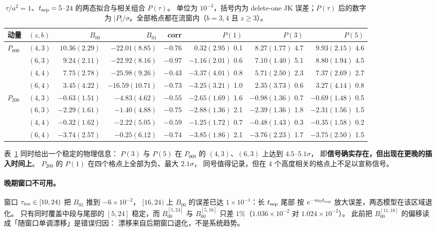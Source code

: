 \documentclass[UTF8,a4paper,11pt]{ctexart}
\begin{document}
\begin{table}[htbp]
\centering
\caption{$\tau/a^2=1$、$t_{\rm sep}=5$--$24$ 的两态拟合与相关组合 $P(\tau)$。
单位为 $10^{-3}$，括号内为 delete-one JK 误差；$P(\tau)$ 后的数字为
$|P|/\sigma$。全部格点都在流窗内（$b=3,4$ 且 $z\ge3$）。}
\label{tab:tau1combo}
\footnotesize
\setlength{\tabcolsep}{3pt}
\begin{tabular}{@{}llrrrrrr@{}}
\toprule
动量 & $(z,b)$ & $B_{00}$ & $B_{01}$ & corr & $P(1)$ & $P(3)$ & $P(5)$ \\
\midrule
\multirow{4}{*}{$P_{000}$}
 & $(4,3)$ & $10.36(2.29)$ & $-22.01(8.85)$ & $-0.76$ & $0.32(2.95)$ 0.1 & $8.27(1.77)$ 4.7 & $9.93(2.15)$ 4.6 \\
 & $(6,3)$ & $9.24(2.11)$  & $-22.92(8.16)$ & $-0.97$ & $-1.16(2.01)$ 0.6 & $7.10(1.40)$ 5.1 & $8.80(1.94)$ 4.5 \\
 & $(4,4)$ & $7.75(2.78)$  & $-25.98(9.26)$ & $-0.43$ & $-3.37(4.01)$ 0.8 & $5.71(2.50)$ 2.3 & $7.37(2.69)$ 2.7 \\
 & $(6,4)$ & $3.45(4.22)$  & $-16.59(10.71)$ & $-0.73$ & $-3.25(3.21)$ 1.0 & $2.35(3.73)$ 0.6 & $3.27(4.14)$ 0.8 \\
\midrule
\multirow{4}{*}{$P_{200}$}
 & $(4,3)$ & $-0.63(1.51)$ & $-4.83(4.62)$ & $-0.55$ & $-2.65(1.69)$ 1.6 & $-0.98(1.36)$ 0.7 & $-0.69(1.48)$ 0.5 \\
 & $(6,3)$ & $-2.29(1.61)$ & $-1.40(4.88)$ & $-0.75$ & $-2.88(1.36)$ 2.1 & $-2.39(1.36)$ 1.8 & $-2.31(1.56)$ 1.5 \\
 & $(4,4)$ & $-0.32(1.62)$ & $-2.22(5.05)$ & $-0.59$ & $-1.25(1.72)$ 0.7 & $-0.48(1.43)$ 0.3 & $-0.35(1.58)$ 0.2 \\
 & $(6,4)$ & $-3.74(2.57)$ & $-0.25(6.12)$ & $-0.74$ & $-3.85(1.86)$ 2.1 & $-3.76(2.23)$ 1.7 & $-3.75(2.50)$ 1.5 \\
\bottomrule
\end{tabular}
\end{table}

表~\ref{tab:tau1combo} 同时给出一个稳定的物理信息：
$P(3)$ 与 $P(5)$ 在 $P_{000}$ 的 $(4,3)$、$(6,3)$ 上达到 $4.5$--$5.1\sigma$，
即\textbf{信号确实存在，但出现在更晚的插入时间上}。
$P_{200}$ 的 $P(1)$ 在四个格点上全部为负、最大 $2.1\sigma$，
同号值得记录，但在 4 个高度相关的格点上不足以宣称信号。

\paragraph{晚期窗口不可用。}
窗口 $\tau_{\rm ins}\in[10,24)$ 把 $B_{01}$ 推到 $-6\times10^{-2}$，
$[16,24)$ 上 $B_{00}$ 的误差已达 $1\times10^{-1}$：长 $t_{\rm sep}$ 尾部
按 $e^{-m_0t_{\rm sep}}$ 放大误差，两态模型在该区域退化。
只有同时覆盖中段与尾部的 $[5,24]$ 稳定，而 $B_{00}^{[5,24]}$ 与
$B_{00}^{[5,16]}$ 只差 $1\%$（$1.036\times10^{-2}$ 对 $1.024\times10^{-2}$）。
此前把 $B_{00}^{[11,16]}$ 的偏移读成「随窗口单调漂移」是错误归因：
漂移来自后期窗口退化，不是系统趋势。
\end{document}
